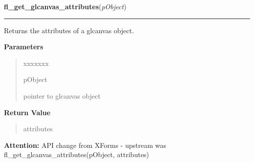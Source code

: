     \label{xformslib:library:fl_get_glcanvas_attributes}

    \vspace{0.5ex}

\hspace{.8\funcindent}\begin{boxedminipage}{\funcwidth}

    \raggedright \textbf{fl\_get\_glcanvas\_attributes}(\textit{pObject})

    \vspace{-1.5ex}

    \rule{\textwidth}{0.5\fboxrule}
\setlength{\parskip}{2ex}
    Returns the attributes of a glcanvas object.

\setlength{\parskip}{1ex}
      \textbf{Parameters}
      \vspace{-1ex}

      \begin{quote}
        \begin{Ventry}{xxxxxxx}

          \item[pObject]

          pointer to glcanvas object

        \end{Ventry}

      \end{quote}

      \textbf{Return Value}
    \vspace{-1ex}

      \begin{quote}
      attributes

      \end{quote}

\textbf{Attention:} API change from XForms - upstream was 
fl\_get\_glcanvas\_attributes(pObject, attributes)



    \end{boxedminipage}

    \label{xformslib:library:fl_set_glcanvas_direct}

    \vspace{0.5ex}

